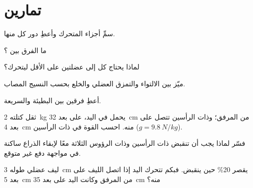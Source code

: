 \section{تمارين}

\begin{exercise}[$\star$]\label{exo:g10:muscles-and-joints:1}
سمِّ أجزاء  المتحرك وأعطِ دور كل منها.
\end{exercise}

\begin{exercise}[$\star$]\label{exo:g10:muscles-and-joints:2}
ما الفرق بين  ؟
\end{exercise}

\begin{exercise}[$\star$]\label{exo:g10:muscles-and-joints:3}
لماذا يحتاج كل  إلى عضلتين على الأقل ليتحرك؟
\end{exercise}

\begin{exercise}[$\star$]\label{exo:g10:muscles-and-joints:4}
ميّز بين الالتواء والتمزق العضلي والخلع بحسب النسيج المصاب.
\end{exercise}

\begin{exercise}[$\star$]\label{exo:g10:muscles-and-joints:5}
أعطِ فرقين بين  البطيئة والسريعة.
\end{exercise}

\begin{exercise}[$\star\star$]\label{exo:g10:muscles-and-joints:6}
ثقل كتلته \qty{2}{kg} يحمل في اليد، على بعد \qty{32}{cm} من المرفق؛
وذات الرأسين تتصل على بعد \qty{4}{cm} منه. احسب القوة في ذات الرأسين
($g = \qty{9.8}{N/kg}$).
\end{exercise}

\begin{exercise}[$\star\star$]\label{exo:g10:muscles-and-joints:7}
فسّر لماذا يجب أن تنقبض ذات الرأسين وذات الرؤوس الثلاثة معًا لإبقاء
الذراع ساكنة في مواجهة دفع غير متوقع.
\end{exercise}

\begin{exercise}[$\star\star$]\label{exo:g10:muscles-and-joints:8}
ليف عضلي طوله \qty{3}{cm} يقصر 20\% حين ينقبض. فبكم تتحرك اليد إذا
اتصل  الليف على بعد \qty{5}{cm} من المرفق وكانت اليد على بعد
\qty{35}{cm} منه؟
\end{exercise}

